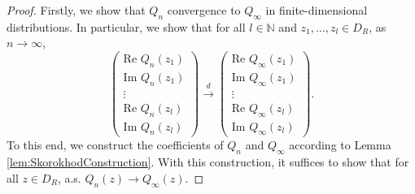 \documentclass[12pt, reqno]{amsart}
\theoremstyle{plain}
\theoremstyle{definition}
\begin{document}
\begin{proof}
	Firstly, we show that $Q_n$ convergence to $Q_\infty$ in finite-dimensional distributions. In particular, we show that for all $l \in \mathbb{N}$ and $z_1, \dots, z_l \in D_{R}$, as $n \rightarrow \infty$,
	\begin{equation*}
		\begin{pmatrix}
			\text{Re } Q_n(z_1) \\
			\text{Im }  Q_n(z_1) \\
			\vdots \\
			\text{Re } Q_n(z_l) \\
			\text{Im } Q_n(z_l)
		\end{pmatrix} \xrightarrow[]{d} \begin{pmatrix}
			\text{Re } Q_\infty(z_1) \\
			\text{Im } Q_\infty(z_1) \\
			\vdots \\
			\text{Re } Q_\infty(z_l) \\
			\text{Im } Q_\infty(z_l)
		\end{pmatrix}.
	\end{equation*}
	To this end, we construct the coefficients of $Q_n$ and $Q_\infty$ according to Lemma \ref{lem:SkorokhodConstruction}. With this construction, it suffices to show that for all $z \in D_R$, a.s. $Q_n(z) \to Q_\infty(z)$.
	

\end{proof}
\end{document}
